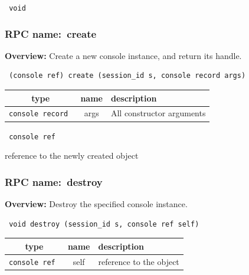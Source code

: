 {\tt 
void
}



\vspace{0.3cm}
\vspace{0.3cm}
\vspace{0.3cm}
\subsubsection{RPC name:~create}

{\bf Overview:} 
Create a new console instance, and return its handle.

\begin{verbatim} (console ref) create (session_id s, console record args)\end{verbatim}



 
\vspace{0.3cm}
\begin{tabular}{|c|c|p{7cm}|}
 \hline
{\bf type} & {\bf name} & {\bf description} \\ \hline
{\tt console record } & args & All constructor arguments \\ \hline 

\end{tabular}

\vspace{0.3cm}

{\tt 
console ref
}


reference to the newly created object
\vspace{0.3cm}
\vspace{0.3cm}
\vspace{0.3cm}
\subsubsection{RPC name:~destroy}

{\bf Overview:} 
Destroy the specified console instance.

\begin{verbatim} void destroy (session_id s, console ref self)\end{verbatim}



 
\vspace{0.3cm}
\begin{tabular}{|c|c|p{7cm}|}
 \hline
{\bf type} & {\bf name} & {\bf description} \\ \hline
{\tt console ref } & self & reference to the object \\ \hline 

\end{tabular}

